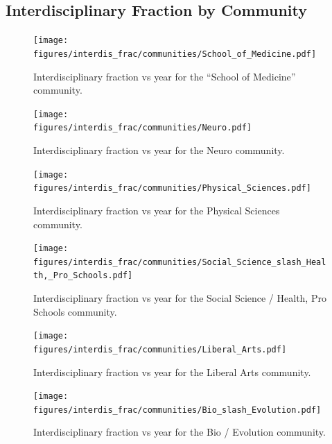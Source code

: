 \documentclass[notitlepage,aps,prd,nofootinbib]{revtex4-1}
\newcommand{\figures}{../outputs/plots}
\begin{document}
\begin{appendices}
\section{Interdisciplinary Fraction by Community}

\begin{figure}[!htb]\centering
  \texttt{[image: \\figures/interdis\_frac/communities/School\_of\_Medicine.pdf]}
  \caption{Interdisciplinary fraction vs year for the ``School of Medicine'' community.}
\end{figure}

\begin{figure}[!htb]\centering
  \texttt{[image: \\figures/interdis\_frac/communities/Neuro.pdf]}
  \caption{Interdisciplinary fraction vs year for the Neuro community.}
\end{figure}

\begin{figure}[!htb]\centering
  \texttt{[image: \\figures/interdis\_frac/communities/Physical\_Sciences.pdf]}
  \caption{Interdisciplinary fraction vs year for the Physical Sciences community.}
\end{figure}

\begin{figure}[!htb]\centering
  \texttt{[image: \\figures/interdis\_frac/communities/Social\_Science\_slash\_Health,\_Pro\_Schools.pdf]}
  \caption{Interdisciplinary fraction vs year for the Social Science / Health, Pro Schools community.}
\end{figure}

\begin{figure}[!htb]\centering
  \texttt{[image: \\figures/interdis\_frac/communities/Liberal\_Arts.pdf]}
  \caption{Interdisciplinary fraction vs year for the Liberal Arts community.}
\end{figure}

\begin{figure}[!htb]\centering
  \texttt{[image: \\figures/interdis\_frac/communities/Bio\_slash\_Evolution.pdf]}
  \caption{Interdisciplinary fraction vs year for the Bio / Evolution community.}
\end{figure}



\end{appendices}
\end{document}
